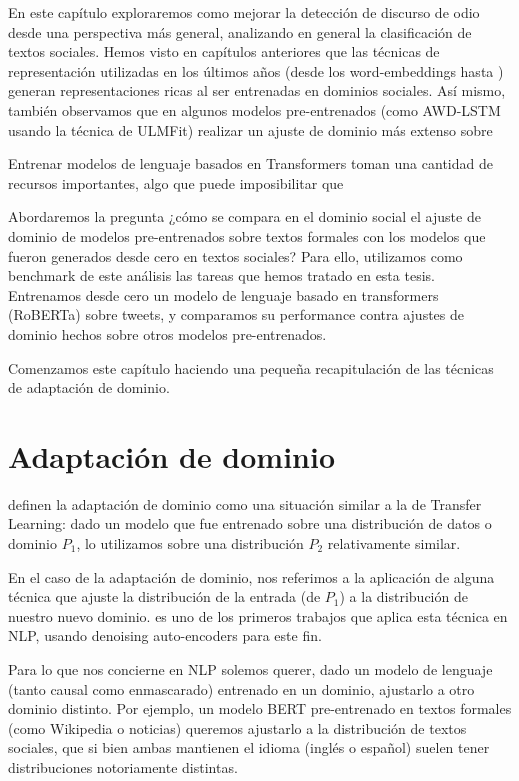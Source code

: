 
En este capítulo exploraremos como mejorar la detección de discurso de odio desde una perspectiva más general, analizando en general la clasificación de textos sociales. Hemos visto en capítulos anteriores que las técnicas de representación utilizadas en los últimos años (desde los word-embeddings hasta ) generan representaciones ricas al ser entrenadas en dominios sociales. Así mismo, también observamos que en algunos modelos pre-entrenados (como AWD-LSTM usando la técnica de ULMFit)  realizar un ajuste de dominio más extenso sobre

Entrenar modelos de lenguaje basados en Transformers toman una cantidad de recursos importantes, algo que puede imposibilitar que

Abordaremos la pregunta ¿cómo se compara en el dominio social el ajuste de dominio de modelos pre-entrenados sobre textos formales con los modelos que fueron generados desde cero en textos sociales? Para ello, utilizamos como benchmark de este análisis las tareas que hemos tratado en esta tesis. Entrenamos desde cero un modelo de lenguaje basado en transformers (RoBERTa)\cite{liu2019roberta} sobre tweets, y comparamos su performance contra ajustes de dominio hechos sobre otros modelos pre-entrenados.

Comenzamos este capítulo haciendo una pequeña recapitulación de las técnicas de adaptación de dominio.

\section{Adaptación de dominio}

\citet{goodfellow2016deep} definen la adaptación de dominio como una situación similar a la de Transfer Learning: dado un modelo que fue entrenado sobre una distribución de datos o dominio $P_1$, lo utilizamos sobre una distribución $P_2$ relativamente similar.

En el caso de la adaptación de dominio, nos referimos a la aplicación de alguna técnica que ajuste la distribución de la entrada (de $P_1$) a la distribución de nuestro nuevo dominio. \citet{glorot2011domain} es uno de los primeros trabajos que aplica esta técnica en NLP, usando denoising auto-encoders para este fin.

Para lo que nos concierne en NLP solemos querer, dado un modelo de lenguaje (tanto causal como enmascarado) entrenado en un dominio, ajustarlo a otro dominio distinto. Por ejemplo, un modelo BERT pre-entrenado en textos formales (como Wikipedia o noticias) queremos ajustarlo a la distribución de textos sociales, que si bien ambas mantienen el idioma (inglés o español) suelen tener distribuciones notoriamente distintas.

